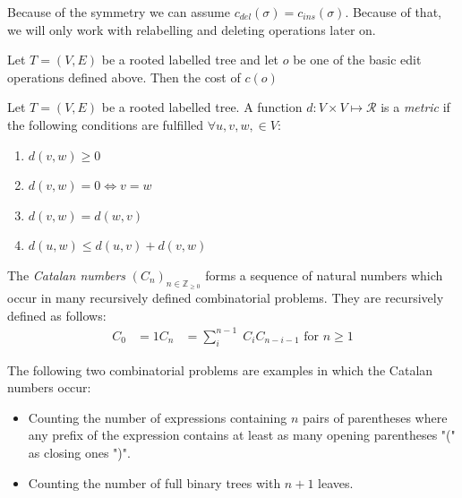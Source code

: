 \begin{rem}
Because of the symmetry we can assume $c_{del}(\sigma) = c_{ins}(\sigma)$. Because of that, we will only work with relabelling and deleting operations later on.
\end{rem}
\begin{defin}
Let $T=(V,E)$ be a rooted labelled tree and let $o$ be one of the basic edit operations defined above. Then the cost of $c(o)$
\end{defin}
\begin{defin}
Let $T=(V,E)$ be a rooted labelled tree. A function $d: V\times V \mapsto \mathcal{R}$ is a \textit{metric} if the following conditions are fulfilled $\forall u,v,w, \in V$:
\begin{enumerate}
\item $d(v,w) \geq 0$
\item $d(v,w) = 0 \iff v=w$
\item $d(v,w) = d(w,v)$
\item $d(u,w) \leq d(u,v) + d(v,w)$
\end{enumerate}
\end{defin}

\begin{defin}
The \textit{Catalan numbers} $(C_n)_{n \in \mathbb{Z}_{\geq 0}}$ forms a sequence of natural numbers which occur in many recursively defined combinatorial problems. They are recursively defined as follows:
\begin{align*}
C_0 &= 1
C_n &= \sum_i^{n-1} \; C_i C_{n-i-1} \text{ for } n \geq 1 
\end{align*}
\end{defin}
\begin{rem}
The following two combinatorial problems are examples in which the Catalan numbers occur:
\begin{itemize}
\item Counting the number of expressions containing $n$ pairs of parentheses where any prefix of the expression contains at least as many opening parentheses "(" as closing ones ")".
\item Counting the number of full binary trees with $n+1$ leaves.
\end{itemize}
\end{rem}
